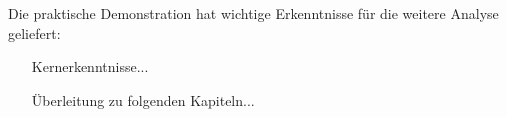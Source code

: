 Die praktische Demonstration hat wichtige Erkenntnisse für die weitere Analyse geliefert:
\begin{itemize}
    \item [Kernerkenntnisse...]
    \item [Überleitung zu folgenden Kapiteln...]
\end{itemize} 